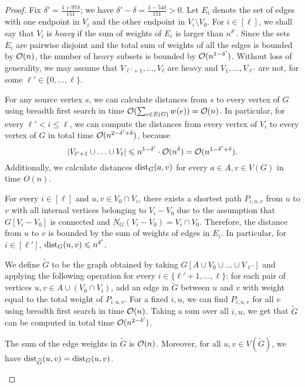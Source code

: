 \begin{proof}
Fix $\delta' = \frac{1 + 97 \delta}{151}$; we have $\delta' - \delta = \frac{1 - 54\delta}{151} > 0$.
Let $E_i$ denote the set of edges with one endpoint in $V_i$ and the other endpoint in $V_i \setminus V_0$. For $i \in [\ell]$, we shall say that $V_i$ is {\em{heavy}} if the sum of weights of $E_i$ is larger than $n^{\delta'}$. Since the sets $E_i$ are pairwise disjoint and the total sum of weights of all the edges is bounded by $\mathcal{O}(n)$, the number of heavy subsets is bounded by $\mathcal{O}(n^{1 - \delta'})$. Without loss of generality, we may assume that $V_{\ell' + 1}, \dots, V_\ell$ are heavy and $V_1, \dots, V_{\ell'}$ are not, for some $\ell'\in \{0,\ldots,\ell\}$.


For any source vertex $s$, we can calculate distances from $s$ to every vertex of $G$  using breadth first search in time $\mathcal{O}(\sum_{e \in E(G)} w(e)) = \mathcal{O}(n)$.
In particular, for every $\ell' < i \leq \ell$, we can compute the distances from every vertex of $V_i$ to every vertex of $G$ in total time $\mathcal{O}(n^{2 - \delta' + \delta})$, because $$|V_{\ell'+1}\cup \ldots\cup V_{\ell}|\leqslant n^{1-\delta'}\cdot \mathcal{O}(n^\delta)=\mathcal{O}(n^{1-\delta'+
\delta}).$$
Additionally, we calculate distances $\mathrm{dist}_G(a, v)$ for every $a \in A, v \in V(G)$ in time $O(n)$.

For every $i \in [\ell]$ and $u,v \in V_0 \cap V_i$, there exists a shortest path $P_{i,u,v}$ from $u$ to $v$ with all internal vertices belonging to $V_i - V_0$ due to the assumption that $G[V_i - V_0]$ is connected and $N_G(V_i - V_0) = V_i \cap V_0$. Therefore, the distance from $u$ to $v$ is bounded by the sum of weights of edges in $E_i$. In particular, for $i \in [\ell']$, $\mathrm{dist}_G(u, v) \leqslant n^{\delta'}$.

We define $\widetilde{G}$ to be the graph obtained by taking $G[A \cup V_0 \cup \dots \cup V_{\ell'}]$ and applying the following operation for every $i \in \{\ell' + 1, \dots, \ell\}$:
for each pair of vertices $u, v \in A \cup (V_0 \cap V_i)$, add an edge in $\widetilde{G}$ between $u$ and $v$ with weight equal to the total weight of $P_{i,u,v}$. For a fixed $i, u$, we can find $P_{i, u, v}$ for all $v$ using breadth first search in time $\mathcal{O}(n)$. Taking a sum over all $i, u$, we get that $\tilde{G}$ can be computed in total time $\mathcal{O}(n^{2 - \delta'})$.


\begin{claim}\label{cl:wG}
The sum of the edge weights in $\widetilde{G}$ is $\mathcal{O}(n)$. Moreover, for all $u, v \in V(\widetilde{G})$, we have $\mathrm{dist}_{\widetilde{G}}(u, v) = \mathrm{dist}_{G}(u, v)$.
\end{claim}


\end{proof}
